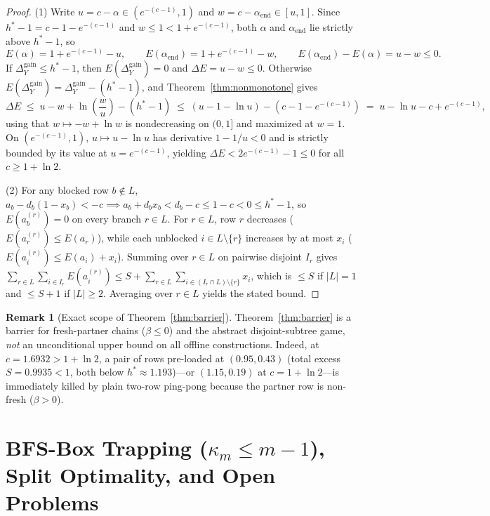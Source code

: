 \documentclass[11pt]{article}
\theoremstyle{definition}
\newtheorem{remark}[theorem]{Remark}
\newcommand{\disc}{\Delta}
\begin{document}
\begin{proof}
(1) Write $u=c-\alpha\in(e^{-(c-1)},1)$ and $w=c-\alpha_{\mathrm{end}}\in[u,1]$. Since $h^*-1=c-1-e^{-(c-1)}$ and $w\le 1<1+e^{-(c-1)}$, both $\alpha$ and $\alpha_{\mathrm{end}}$ lie strictly above $h^*-1$, so
\[
 E(\alpha)=1+e^{-(c-1)}-u,\qquad E(\alpha_{\mathrm{end}})=1+e^{-(c-1)}-w,\qquad E(\alpha_{\mathrm{end}})-E(\alpha)=u-w\le 0.
\]
If $\disc_Y^{\mathrm{gain}}\le h^*-1$, then $E(\disc_Y^{\mathrm{gain}})=0$ and $\Delta E=u-w\le 0$. Otherwise $E(\disc_Y^{\mathrm{gain}})=\disc_Y^{\mathrm{gain}}-(h^*-1)$, and Theorem~\ref{thm:nonmonotone} gives
\[
 \Delta E \;\le\; u - w + \ln\!\left(\frac{w}{u}\right) - (h^*-1)
 \;\le\; (u - 1 - \ln u) - (c - 1 - e^{-(c-1)})
 \;=\; u - \ln u - c + e^{-(c-1)},
\]
using that $w\mapsto -w+\ln w$ is nondecreasing on $(0,1]$ and maximized at $w=1$. On $(e^{-(c-1)},1)$, $u\mapsto u-\ln u$ has derivative $1-1/u<0$ and is strictly bounded by its value at $u=e^{-(c-1)}$, yielding $\Delta E < 2e^{-(c-1)}-1\le 0$ for all $c\ge 1+\ln 2$.

(2) For any blocked row $b\notin L$, $a_b - d_b(1-x_b) < -c \implies a_b + d_b x_b < d_b - c \le 1 - c < 0 \le h^*-1$, so $E(a_b^{(r)})=0$ on every branch $r\in L$. For $r\in L$, row $r$ decreases ($E(a_r^{(r)})\le E(a_r)$), while each unblocked $i\in L\setminus\{r\}$ increases by at most $x_i$ ($E(a_i^{(r)})\le E(a_i)+x_i$). Summing over $r\in L$ on pairwise disjoint $I_r$ gives $\sum_{r\in L}\sum_{i\in I_r} E(a_i^{(r)})\le S + \sum_{r\in L}\sum_{i\in (I_r\cap L)\setminus\{r\}} x_i$, which is $\le S$ if $|L|=1$ and $\le S+1$ if $|L|\ge 2$. Averaging over $r\in L$ yields the stated bound.
\end{proof}

\begin{remark}[Exact scope of Theorem~\ref{thm:barrier}]
Theorem~\ref{thm:barrier} is a barrier for fresh-partner chains ($\beta\le 0$) and the abstract disjoint-subtree game, \emph{not} an unconditional upper bound on all offline constructions. Indeed, at $c=1.6932>1+\ln 2$, a pair of rows pre-loaded at $(0.95,0.43)$ (total excess $S=0.9935<1$, both below $h^*\approx 1.193$)---or $(1.15,0.19)$ at $c=1+\ln 2$---is immediately killed by plain two-row ping-pong because the partner row is non-fresh ($\beta>0$).
\end{remark}

\section{BFS-Box Trapping ($\kappa_m\le m-1$), Split Optimality, and Open Problems}
\end{document}
